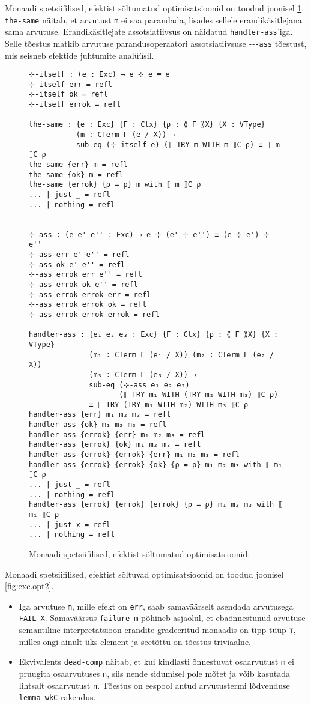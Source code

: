 \documentclass[a4paper,12pt]{article}
\begin{document}
Monaadi spetsiifilised, efektist sõltumatud optimisatsioonid on toodud joonisel \ref{fig:exc.opt1}.
{\tt the-same} näitab, et arvutust {\tt m} ei saa parandada, lisades sellele erandikäsitlejana sama arvutuse.
Erandikäsitlejate assotsiatiivsus on näidatud {\tt handler-ass}'iga.
Selle tõestus matkib arvutuse parandusoperaatori assotsiatiivsuse {\tt ⊹-ass} tõestust, mis seisneb efektide juhtumite analüüsil.

\begin{figure}
  \begin{BVerbatim}
⊹-itself : (e : Exc) → e ⊹ e ≡ e
⊹-itself err = refl
⊹-itself ok = refl
⊹-itself errok = refl

the-same : {e : Exc} {Γ : Ctx} {ρ : ⟪ Γ ⟫X} {X : VType}
           (m : CTerm Γ (e / X)) →
           sub-eq (⊹-itself e) (⟦ TRY m WITH m ⟧C ρ) ≡ ⟦ m ⟧C ρ
the-same {err} m = refl
the-same {ok} m = refl
the-same {errok} {ρ = ρ} m with ⟦ m ⟧C ρ
... | just _ = refl
... | nothing = refl


⊹-ass : (e e' e'' : Exc) → e ⊹ (e' ⊹ e'') ≡ (e ⊹ e') ⊹ e''
⊹-ass err e' e'' = refl
⊹-ass ok e' e'' = refl
⊹-ass errok err e'' = refl
⊹-ass errok ok e'' = refl
⊹-ass errok errok err = refl
⊹-ass errok errok ok = refl
⊹-ass errok errok errok = refl

handler-ass : {e₁ e₂ e₃ : Exc} {Γ : Ctx} {ρ : ⟪ Γ ⟫X} {X : VType}
              (m₁ : CTerm Γ (e₁ / X)) (m₂ : CTerm Γ (e₂ / X))
              (m₃ : CTerm Γ (e₃ / X)) →
              sub-eq (⊹-ass e₁ e₂ e₃)
                     (⟦ TRY m₁ WITH (TRY m₂ WITH m₃) ⟧C ρ)
              ≡ ⟦ TRY (TRY m₁ WITH m₂) WITH m₃ ⟧C ρ
handler-ass {err} m₁ m₂ m₃ = refl
handler-ass {ok} m₁ m₂ m₃ = refl
handler-ass {errok} {err} m₁ m₂ m₃ = refl
handler-ass {errok} {ok} m₁ m₂ m₃ = refl
handler-ass {errok} {errok} {err} m₁ m₂ m₃ = refl
handler-ass {errok} {errok} {ok} {ρ = ρ} m₁ m₂ m₃ with ⟦ m₁ ⟧C ρ
... | just _ = refl
... | nothing = refl
handler-ass {errok} {errok} {errok} {ρ = ρ} m₁ m₂ m₃ with ⟦ m₁ ⟧C ρ
... | just x = refl
... | nothing = refl
  \end{BVerbatim}
  \caption{Monaadi spetsiifilised, efektist sõltumatud optimisatsioonid.}
  \label{fig:exc.opt1}
\end{figure}

Monaadi spetsiifilised, efektist sõltuvad optimisatsioonid on toodud joonisel \ref{fig:exc.opt2}.
\begin{itemize}
\item Iga arvutuse {\tt m}, mille efekt on {\tt err}, saab samaväärselt asendada arvutusega {\tt FAIL X}.
  Samaväärsus {\tt failure m} põhineb asjaolul, et ebaõnnestunud arvutuse semantiline interpretatsioon erandite gradeeritud monaadis on tipp-tüüp {\tt ⊤}, milles ongi ainult üks element ja seetõttu on tõestus triviaalne.
\item Ekvivalents {\tt dead-comp} näitab, et kui kindlasti õnnestuvat osaarvutust {\tt m} ei pruugita osaarvutuses {\tt n}, siis nende sidumisel pole mõtet ja võib kasutada lihtsalt osaarvutust {\tt n}. Tõestus on eespool antud arvutustermi lõdvenduse {\tt lemma-wkC} rakendus.
\end{itemize}
\end{document}

